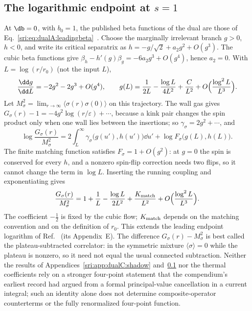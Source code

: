 \subsection{The logarithmic endpoint at \texorpdfstring{$s=1$}{s=1}}\label{sri:app:dualC:logs}
At $\db=0$, with $b_0=1$, the published beta functions of the dual are those of
Eq.~\eqref{sri:eq:dualA:leadingbeta}~\cite{sri:Benedetti:2025nzp}.
Choose the marginally irrelevant branch $g>0$, $h<0$, and write its critical separatrix as
$h=-g/\sqrt2+a_2g^2+O(g^3)$. The cubic beta functions give $\beta_h-h'(g)\beta_g=-6a_2g^3+O(g^4)$, hence $a_2=0$.
With $L=\log(r/r_0)$ (not the input $L$),
\begin{equation}
 \frac{\dd g}{\dd L}=-2g^2-2g^3+O(g^4),\qquad
 g(L)=\frac1{2L}-\frac{\log L}{4L^2}+\frac{C}{L^2}+O\Bigl(\frac{\log^2L}{L^3}\Bigr).
\end{equation}
Let $M_\sigma^2=\lim_{r\to\infty}\langle\sigma(r)\sigma(0)\rangle$ on this trajectory. The wall gas gives
$G_\sigma(r)-1=-4g^2\log(r/\varepsilon)+\cdots$, because a kink pair changes the spin product only when one wall lies
between the insertions; so $\gamma_\sigma=2g^2+\cdots$, and
\begin{equation}
 \log\frac{G_\sigma(r)}{M_\sigma^2}=2\int_L^\infty\gamma_\sigma\bigl(g(u'),h(u')\bigr)\dd u'+\log F_\sigma\bigl(g(L),h(L)\bigr).
\end{equation}
The finite matching function satisfies $F_\sigma=1+O(g^2)$: at $g=0$ the spin is conserved for every $h$, and a nonzero
spin-flip correction needs two flips, so it cannot change the term in $\log L$. Inserting the running coupling and
exponentiating gives
\begin{equation}
 \frac{G_\sigma(r)}{M_\sigma^2}=1+\frac1L-\frac{\log L}{2L^2}+\frac{K_{\rm match}}{L^2}+O\Bigl(\frac{\log^2L}{L^3}\Bigr).
\end{equation}
The coefficient $-\frac12$ is fixed by the cubic flow; $K_{\rm match}$ depends on the matching convention and on the
definition of $r_0$. This extends the leading endpoint logarithm of Ref.~\cite{sri:Benedetti:2025nzp} (its Appendix~E).
The difference $G_\sigma(r)-M_\sigma^2$ is best called the plateau-subtracted correlator: in the symmetric mixture
$\langle\sigma\rangle=0$ while the plateau is nonzero, so it need not equal the usual connected subtraction. Neither
the results of Appendices~\ref{sri:app:dualC:shadow} and~\ref{sri:app:dualC:logs} nor the thermal coefficients rely on a
stronger four-point statement that the compendium's earliest record had argued from a formal
principal-value cancellation in a current integral; such an identity alone does not determine composite-operator
counterterms or the fully renormalized four-point function.

